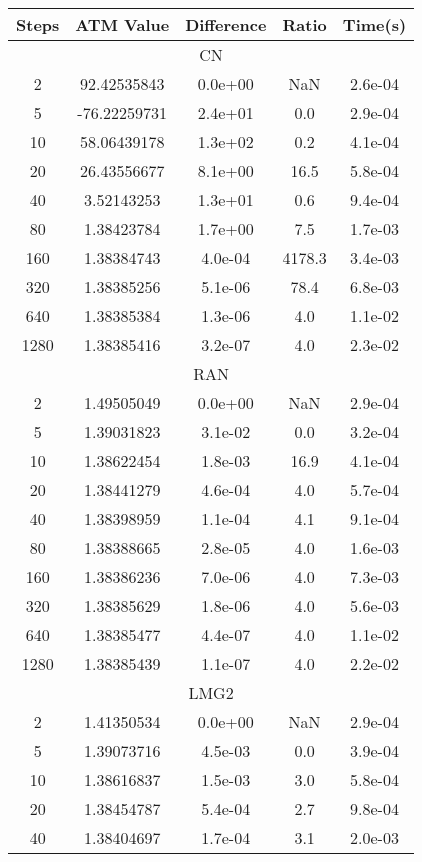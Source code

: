 \documentclass[]{rAMF2e}
\begin{document}
{\small
\begin{table}[htp]
\begin{tabular}{|c|c|c|c|c|}
\hline
Steps & ATM Value & Difference & Ratio & Time(s)\\
\hline \multicolumn{5}{|c|}{CN} \\ \hline
 2 & 92.42535843 & 0.0e+00 & NaN & 2.6e-04\\
 5 & -76.22259731 & 2.4e+01 & 0.0 & 2.9e-04\\
 10 & 58.06439178 & 1.3e+02 & 0.2 & 4.1e-04\\
 20 & 26.43556677 & 8.1e+00 & 16.5 & 5.8e-04\\
 40 & 3.52143253 & 1.3e+01 & 0.6 & 9.4e-04\\
 80 & 1.38423784 & 1.7e+00 & 7.5 & 1.7e-03\\
 160 & 1.38384743 & 4.0e-04 & 4178.3 & 3.4e-03\\
 320 & 1.38385256 & 5.1e-06 & 78.4 & 6.8e-03\\
 640 & 1.38385384 & 1.3e-06 & 4.0 & 1.1e-02\\
 1280 & 1.38385416 & 3.2e-07 & 4.0 & 2.3e-02\\
\hline \multicolumn{5}{|c|}{RAN} \\ \hline
 2 & 1.49505049 & 0.0e+00 & NaN & 2.9e-04\\
 5 & 1.39031823 & 3.1e-02 & 0.0 & 3.2e-04\\
 10 & 1.38622454 & 1.8e-03 & 16.9 & 4.1e-04\\
 20 & 1.38441279 & 4.6e-04 & 4.0 & 5.7e-04\\
 40 & 1.38398959 & 1.1e-04 & 4.1 & 9.1e-04\\
 80 & 1.38388665 & 2.8e-05 & 4.0 & 1.6e-03\\
 160 & 1.38386236 & 7.0e-06 & 4.0 & 7.3e-03\\
 320 & 1.38385629 & 1.8e-06 & 4.0 & 5.6e-03\\
 640 & 1.38385477 & 4.4e-07 & 4.0 & 1.1e-02\\
 1280 & 1.38385439 & 1.1e-07 & 4.0 & 2.2e-02\\
\hline \multicolumn{5}{|c|}{LMG2} \\ \hline
 2 & 1.41350534 & 0.0e+00 & NaN & 2.9e-04\\
 5 & 1.39073716 & 4.5e-03 & 0.0 & 3.9e-04\\
 10 & 1.38616837 & 1.5e-03 & 3.0 & 5.8e-04\\
 20 & 1.38454787 & 5.4e-04 & 2.7 & 9.8e-04\\
 40 & 1.38404697 & 1.7e-04 & 3.1 & 2.0e-03\\

\end{tabular}
\end{table}}
\end{document}

